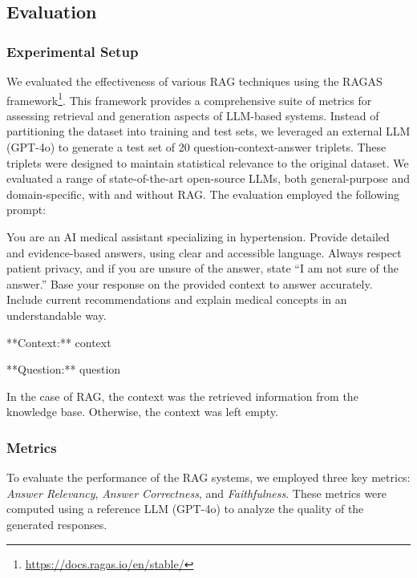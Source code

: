 \subsection{Evaluation}
\label{subsec:evaluation-rag}

\subsubsection{Experimental Setup}
We evaluated the effectiveness of various \gls{RAG} techniques using the RAGAS framework\footnote{\url{https://docs.ragas.io/en/stable/}}.
%
This framework provides a comprehensive suite of metrics for assessing retrieval and generation aspects of \gls{LLM}-based systems.
%
Instead of partitioning the dataset into training and test sets, we leveraged an external \gls{LLM} (GPT-4o) to generate a test set of 20 question-context-answer triplets.
%
These triplets were designed to maintain statistical relevance to the original dataset.
%
We evaluated a range of state-of-the-art open-source \glspl{LLM}, both general-purpose and domain-specific, with and without \gls{RAG}.
%
The evaluation employed the following prompt:
%
\begin{promptbox}
    \scriptsize
    You are an AI medical assistant specializing in hypertension.
    Provide detailed and evidence-based answers, using clear and accessible language. Always respect patient privacy, and if you are unsure of the answer,
    state ``I am not sure of the answer.''
    Base your response on the provided context to answer accurately.
    Include current recommendations and explain medical concepts in an understandable way.

    **Context:** { context }

    **Question:** { question }
\end{promptbox}
%
In the case of \gls{RAG}, the context was the retrieved information from the knowledge base.
%
Otherwise, the context was left empty.


\subsubsection{Metrics}
To evaluate the performance of the \gls{RAG} systems, we employed three key metrics: \textit{Answer Relevancy}, \textit{Answer Correctness}, and \textit{Faithfulness}.
%
These metrics were computed using a reference \gls{LLM} (GPT-4o) to analyze the quality of the generated responses.

